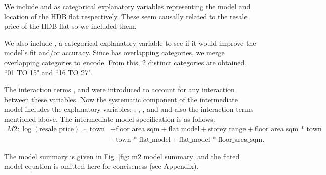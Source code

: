 We include  and  as categorical explanatory variables representing the model and location of the HDB flat respectively. These seem causally related to the resale price of the HDB flat so we included them.

We also include , a categorical explanatory variable to see if it would improve the model's fit and/or accuracy. Since  has overlapping categories, we merge overlapping categories to encode. From this, 2 distinct categories are obtained, ``01 TO 15" and ``16 TO 27".

The interaction terms ,  and  were introduced to account for any interaction between these variables. Now the systematic component of the intermediate model includes the explanatory variables: , \newline{}, , and  and also the interaction terms mentioned above.
The intermediate model specification is as follows:
\begin{align*}
M2: \log(\text{resale\_price}) \sim \text{town} &+ \text{floor\_area\_sqm} + \text{flat\_model} + \text{storey\_range} + \text{floor\_area\_sqm * town} \\ &+ \text{town * flat\_model} + \text{flat\_model * floor\_area\_sqm}.
\end{align*}

\newpage

The model summary is given in Fig. \ref{fig: m2 model summary} and the fitted model equation is omitted here for conciseness (see Appendix).


